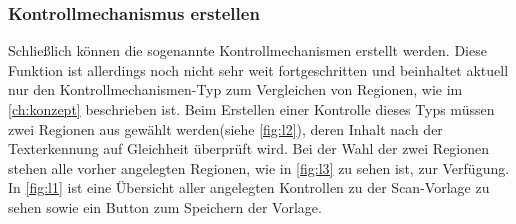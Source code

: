 \documentclass[notables, nomenclature, oneside, 150]{HSMW-Thesis}
\begin{document}
			\vspace{-5mm}
			\subsubsection*{Kontrollmechanismus erstellen}
				Schließlich können die sogenannte Kontrollmechanismen erstellt werden. Diese Funktion ist allerdings noch nicht sehr weit fortgeschritten und beinhaltet aktuell nur den Kontrollmechanismen-Typ zum Vergleichen von Regionen, wie im \autoref{ch:konzept} beschrieben ist. Beim Erstellen einer Kontrolle dieses Typs müssen zwei Regionen aus gewählt werden(siehe \autoref{fig:l2}), deren Inhalt nach der Texterkennung auf Gleichheit überprüft wird. Bei der Wahl der zwei Regionen stehen alle vorher angelegten Regionen, wie in \autoref{fig:l3} zu sehen ist, zur Verfügung. In \autoref{fig:l1} ist eine Übersicht aller angelegten Kontrollen zu der Scan-Vorlage zu sehen sowie ein Button zum Speichern der Vorlage.
				
\end{document}
